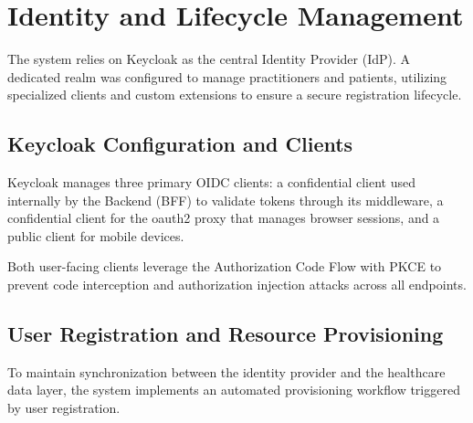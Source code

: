 \section{Identity and Lifecycle Management}\label{sec:security-identity}

The system relies on Keycloak as the central Identity Provider (IdP). 
A dedicated realm was configured to manage practitioners and patients, utilizing specialized clients and custom extensions to ensure a secure registration lifecycle.

\subsection{Keycloak Configuration and Clients}

Keycloak manages three primary OIDC clients: a confidential client used internally by the Backend (BFF) to validate tokens through its middleware, a confidential client for the oauth2 proxy that manages browser sessions, and a public client for mobile devices. 


Both user-facing clients leverage the Authorization Code Flow with PKCE to prevent code interception and authorization injection attacks across all endpoints. 

\subsection{User Registration and Resource Provisioning}

To maintain synchronization between the identity provider and the healthcare data layer, the system implements an automated provisioning workflow triggered by user registration.

